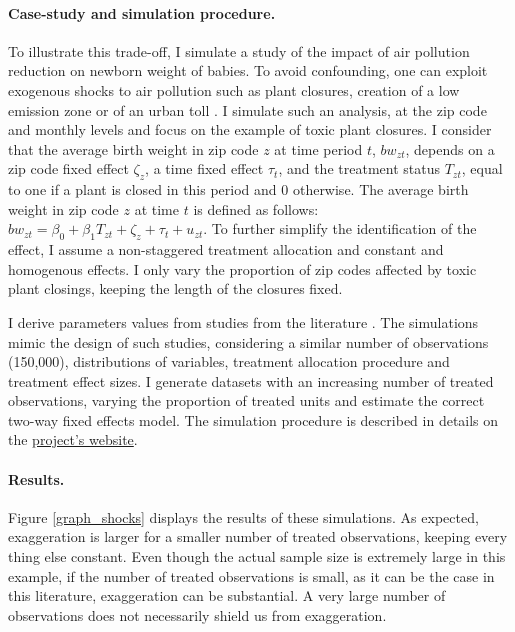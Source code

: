 \documentclass[usletter, 12pt]{article}
\begin{document}
			\paragraph{Case-study and simulation procedure.} %
			To illustrate this trade-off, I simulate a study of the impact of air pollution reduction on newborn weight of babies. To avoid confounding, one can exploit exogenous shocks to air pollution such as plant closures, creation of a low emission zone or of an urban toll \citep{currie_environmental_2015, lavaine_energy_2017}. I simulate such an analysis, at the zip code and monthly levels and focus on the example of toxic plant closures. I consider that the average birth weight in zip code $z$ at time period $t$, $bw_{zt}$, depends on a zip code fixed effect $\zeta_z$, a time fixed effect $\tau_t$, and the treatment status $T_{zt}$, equal to one if a plant is closed in this period and 0 otherwise. The average birth weight in zip code $z$ at time $t$ is defined as follows: $bw_{zt} = \beta_0 + \beta_1 T_{zt} + \zeta_z + \tau_t + u_{zt}$. To further simplify the identification of the effect, I assume a non-staggered treatment allocation and constant and homogenous effects. I only vary the proportion of zip codes affected by toxic plant closings, keeping the length of the closures fixed.

       I derive parameters values from studies from the literature \citep{currie_environmental_2015, lavaine_energy_2017}. The simulations mimic the design of such studies, considering a similar number of observations (150,000), distributions of variables, treatment allocation procedure and treatment effect sizes. I generate datasets with an increasing number of treated observations, varying the proportion of treated units and estimate the correct two-way fixed effects model. The simulation procedure is described in details on the \href{https://vincentbagilet.github.io/causal_exaggeration/shocks.html}{project's website}.
        
			\paragraph{Results.} Figure \ref{graph_shocks} displays the results of these simulations. As expected, exaggeration is larger for a smaller number of treated observations, keeping every thing else constant. Even though the actual sample size is extremely large in this example, if the number of treated observations is small, as it can be the case in this literature, exaggeration can be substantial. A very large number of observations does not necessarily shield us from exaggeration. 
\end{document}
